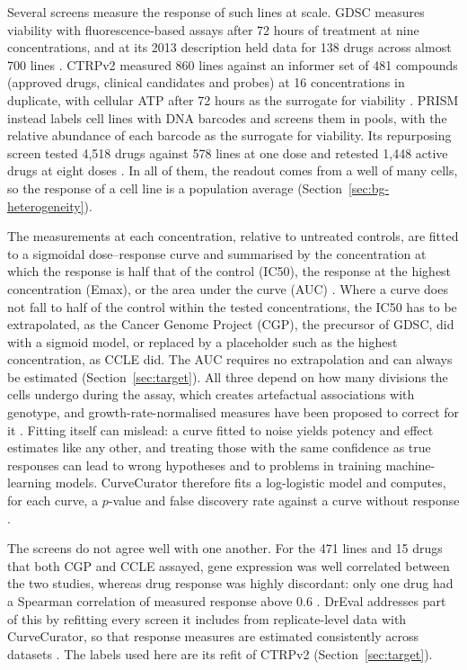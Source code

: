 Several screens measure the response of such lines at scale. GDSC measures viability with fluorescence-based assays after 72 hours of treatment at nine
concentrations, and at its 2013 description held data for 138 drugs across almost 700 lines
\cite{gdsc_yang2013}. CTRPv2 measured 860 lines against an
informer set of 481 compounds (approved drugs, clinical candidates and probes) at 16 concentrations
in duplicate, with cellular ATP after 72 hours as the surrogate for viability \cite{ctrpv2}. PRISM instead labels
cell lines with DNA barcodes and screens them in pools, with the relative abundance of each barcode as
the surrogate for viability. Its repurposing screen tested 4,518 drugs against 578 lines at one dose and
retested 1,448 active drugs at eight doses \cite{corsello2020}. In all of them, the readout comes from a well of many cells, so
the response of a cell line is a population average (Section~\ref{sec:bg-heterogeneity}).

The measurements at each concentration, relative to untreated controls, are fitted to a sigmoidal
dose--response curve and summarised by the concentration at which the response is half that of the
control (IC50), the response at the highest concentration (Emax), or the area under the curve (AUC)
\cite{hafner}. Where a curve does not fall to half of the control within the tested concentrations, the IC50 has to
be extrapolated, as the Cancer Genome Project (CGP), the precursor of GDSC, did with a sigmoid model, or replaced by a placeholder such
as the highest concentration, as CCLE did. The AUC requires no extrapolation and can always be estimated
\cite{haibekains2013} (Section~\ref{sec:target}). All three depend on how
many divisions the cells undergo during the assay, which creates artefactual associations with genotype,
and growth-rate-normalised measures have been proposed to correct for it \cite{hafner}. Fitting itself
can mislead: a curve fitted to noise yields potency and effect estimates like any other, and treating
those with the same confidence as true responses can lead to wrong hypotheses and to problems in
training machine-learning models. CurveCurator therefore fits a log-logistic model and computes, for
each curve, a $p$-value and false discovery rate against a curve without response
\cite{bayer2023curvecurator}.

The screens do not agree well with one another. For the 471 lines and 15 drugs that both CGP and CCLE
assayed, gene expression was well correlated between the
two studies, whereas drug response was highly discordant: only one drug had a Spearman correlation of
measured response above 0.6 \cite{haibekains2013}. DrEval addresses part of this by refitting
every screen it includes from replicate-level data with CurveCurator, so that response measures are
estimated consistently across datasets \cite{dreval}. The labels used here are its refit of CTRPv2
(Section~\ref{sec:target}).

